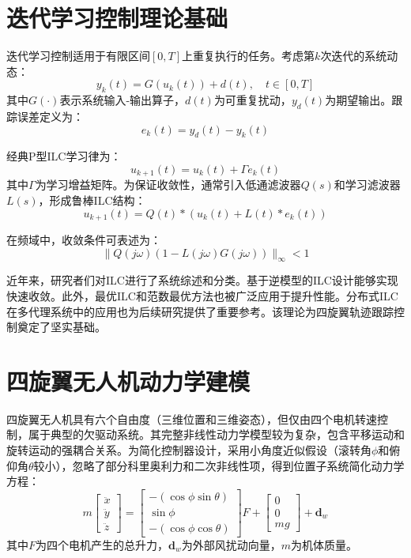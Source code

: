\documentclass[12pt,hyperref,a4paper,UTF8]{ctexart}
\begin{document}
	\section{迭代学习控制理论基础}
	迭代学习控制适用于有限区间$[0,T]$上重复执行的任务。考虑第$k$次迭代的系统动态：
	\begin{equation}
		y_k(t) = G(u_k(t)) + d(t), \quad t \in [0,T]
	\end{equation}
	其中$G(\cdot)$表示系统输入-输出算子，$d(t)$为可重复扰动，$y_d(t)$为期望输出。跟踪误差定义为：
	\begin{equation}
		e_k(t) = y_d(t) - y_k(t)
	\end{equation}
	
	经典P型ILC学习律为：
	\begin{equation}
		u_{k+1}(t) = u_k(t) + \Gamma e_k(t)
	\end{equation}
	其中$\Gamma$为学习增益矩阵。为保证收敛性，通常引入低通滤波器$Q(s)$和学习滤波器$L(s)$，形成鲁棒ILC结构：
	\begin{equation}
		u_{k+1}(t) = Q(t) \ast (u_k(t) + L(t) \ast e_k(t))
	\end{equation}
	
	在频域中，收敛条件可表述为：
	\begin{equation}
		\|Q(j\omega)(1 - L(j\omega)G(j\omega))\|_\infty < 1
	\end{equation}
	
	近年来，研究者们对ILC进行了系统综述和分类\cite{ahn2007, ilc_review2024}。基于逆模型的ILC设计能够实现快速收敛\cite{adlakha2021}。此外，最优ILC和范数最优方法也被广泛应用于提升性能\cite{foudeh2020, bhounsule202x}。分布式ILC在多代理系统中的应用也为后续研究提供了重要参考\cite{hock2016}。该理论为四旋翼轨迹跟踪控制奠定了坚实基础\cite{wei2025, mathworks2025}。
	
	\section{四旋翼无人机动力学建模}
	四旋翼无人机具有六个自由度（三维位置和三维姿态），但仅由四个电机转速控制，属于典型的欠驱动系统。其完整非线性动力学模型较为复杂，包含平移运动和旋转运动的强耦合关系。为简化控制器设计，采用小角度近似假设（滚转角$\phi$和俯仰角$\theta$较小），忽略了部分科里奥利力和二次非线性项，得到位置子系统简化动力学方程：
	\begin{equation}
		m \begin{bmatrix} \ddot{x} \\ \ddot{y} \\ \ddot{z} \end{bmatrix} = \begin{bmatrix} -(\cos\phi\sin\theta) \\ \sin\phi \\ -(\cos\phi\cos\theta) \end{bmatrix} F + \begin{bmatrix} 0 \\ 0 \\ mg \end{bmatrix} + \mathbf{d}_w
	\end{equation}
	其中$F$为四个电机产生的总升力，$\mathbf{d}_w$为外部风扰动向量，$m$为机体质量。
	
\end{document}
